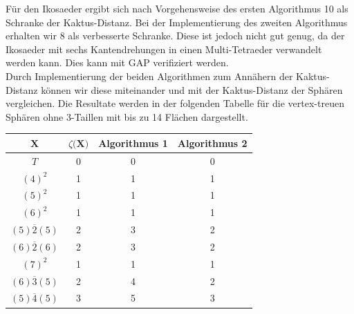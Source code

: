 \documentclass[12pt,titlepage,twoside,cleardoublepage]{article}
\theoremstyle{nummermitklammern}
\newtheorem{lemma}[temp]{Lemma}
\newtheorem{lemma}[zahl]{Lemma}
\numberwithin{equation}{section}
\begin{document}

Für den Ikosaeder ergibt sich nach Vorgehensweise des ersten Algorithmus 10 als Schranke der Kaktus-Distanz.
Bei der Implementierung des zweiten Algorithmus erhalten wir 8 als verbesserte Schranke. Diese ist jedoch nicht gut genug, da der Ikosaeder mit sechs Kantendrehungen in einen Multi-Tetraeder verwandelt werden kann. Dies kann mit GAP verifiziert werden.\\
Durch Implementierung der beiden Algorithmen zum Annähern der Kaktus-Distanz können wir diese miteinander und mit der Kaktus-Distanz der Sphären vergleichen. Die Resultate werden in der folgenden Tabelle für die vertex-treuen Sphären ohne 3-Taillen mit bis zu 14 Flächen dargestellt. 
\begin{center}
\begin{tabular}{|c|c|c|c|}
\hline

$\textbf{X}$&$\textbf{$\zeta$(X)}$&\textbf{Algorithmus 1}&\textbf{Algorithmus 2}\\
\hline
$T$&0&0&0\\
\hline
$(4)^2$&1&1&1\\
\hline
$(5)^2$&1&1&1\\
\hline
$(6)^2$&1&1&1\\
\hline
$(5)\overline{2}(5)$&2&3&2\\
\hline
$(6)\overline{2}(6)$&2&3&2\\
\hline
$(7)^2$&1&1&1\\
\hline
$(6)\overline{3}(5)$&2&4&2\\
\hline
$(5)\overline{4}(5)$&3&5&3\\
\hline
\end{tabular} 
\end{center}
\end{document}
